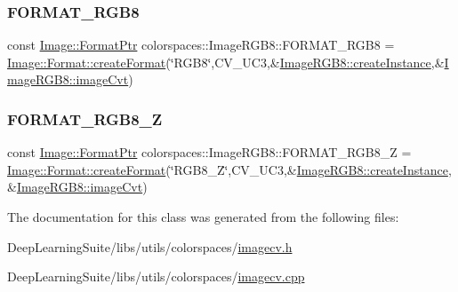 \subsubsection{\texorpdfstring{F\+O\+R\+M\+A\+T\+\_\+\+R\+G\+B8}{FORMAT\_RGB8}}
{\footnotesize\ttfamily const \hyperlink{classcolorspaces_1_1_image_ab3978cc7acc2b5e855f8c715f09667d1}{Image\+::\+Format\+Ptr} colorspaces\+::\+Image\+R\+G\+B8\+::\+F\+O\+R\+M\+A\+T\+\_\+\+R\+G\+B8 = \hyperlink{classcolorspaces_1_1_image_1_1_format_ae79208f237b72cf596331ebcec2ff58b}{Image\+::\+Format\+::create\+Format}(\char`\"{}R\+G\+B8\char`\"{},C\+V\+\_\+U\+C3,\&\hyperlink{classcolorspaces_1_1_image_r_g_b8_ab71cd6e6837845cd0c43ac03e3a86297}{Image\+R\+G\+B8\+::create\+Instance},\&\hyperlink{classcolorspaces_1_1_image_r_g_b8_ac26f79bdedd29a4ab1ee6f9ac0abd928}{Image\+R\+G\+B8\+::image\+Cvt})\hspace{0.3cm}{\ttfamily [static]}}

\mbox{\label{classcolorspaces_1_1_image_r_g_b8_a02a89815364677755b02998334820324}} 
\subsubsection{\texorpdfstring{F\+O\+R\+M\+A\+T\+\_\+\+R\+G\+B8\+\_\+Z}{FORMAT\_RGB8\_Z}}
{\footnotesize\ttfamily const \hyperlink{classcolorspaces_1_1_image_ab3978cc7acc2b5e855f8c715f09667d1}{Image\+::\+Format\+Ptr} colorspaces\+::\+Image\+R\+G\+B8\+::\+F\+O\+R\+M\+A\+T\+\_\+\+R\+G\+B8\+\_\+Z = \hyperlink{classcolorspaces_1_1_image_1_1_format_ae79208f237b72cf596331ebcec2ff58b}{Image\+::\+Format\+::create\+Format}(\char`\"{}R\+G\+B8\+\_\+Z\char`\"{},C\+V\+\_\+U\+C3,\&\hyperlink{classcolorspaces_1_1_image_r_g_b8_ab71cd6e6837845cd0c43ac03e3a86297}{Image\+R\+G\+B8\+::create\+Instance},\&\hyperlink{classcolorspaces_1_1_image_r_g_b8_ac26f79bdedd29a4ab1ee6f9ac0abd928}{Image\+R\+G\+B8\+::image\+Cvt})\hspace{0.3cm}{\ttfamily [static]}}



The documentation for this class was generated from the following files\+:\begin{DoxyCompactItemize}
\item 
Deep\+Learning\+Suite/libs/utils/colorspaces/\hyperlink{imagecv_8h}{imagecv.\+h}\item 
Deep\+Learning\+Suite/libs/utils/colorspaces/\hyperlink{imagecv_8cpp}{imagecv.\+cpp}\end{DoxyCompactItemize}
